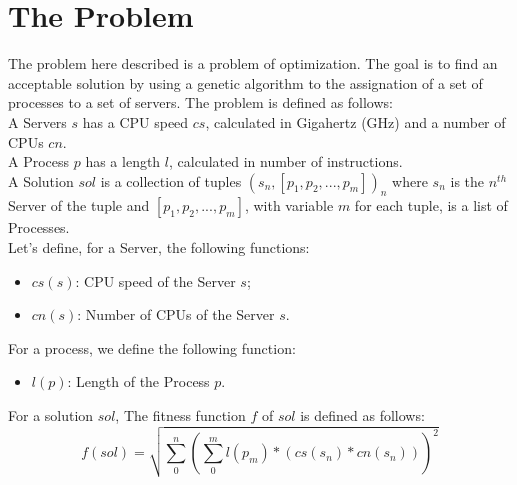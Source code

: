 \section{The Problem}\label{sect:problem}

The problem here described is a problem of optimization. 
The goal is to find an acceptable solution by using a genetic algorithm to the assignation of a set of processes to a set of servers.
The problem is defined as follows:\\
A Servers $s$ has a CPU speed $cs$, calculated in Gigahertz (GHz) and a number of CPUs $cn$.\\
A Process $p$ has a length $l$, calculated in number of instructions.\\
A Solution $sol$ is a collection of tuples $(s_n, [p_1, p_2, ..., p_m])_{n}$ where $s_n$ is the $n^{th}$ Server of the tuple 
and $[p_1, p_2, ..., p_m]$, with variable $m$ for each tuple, is a list of Processes.\\
Let's define, for a Server, the following functions:
\begin{itemize}
    \item $cs(s)$: CPU speed of the Server $s$;
    \item $cn(s)$: Number of CPUs of the Server $s$.\\
\end{itemize}
For a process, we define the following function:
\begin{itemize}
    \item $l(p)$: Length of the Process $p$.\\
\end{itemize}

For a solution $sol$, The fitness function $f$ of $sol$ is defined as follows:
\begin{equation}
    \label{fitness}
    f(sol) = \sqrt{\sum_{0}^{n}{(\sum_{0}^{m}l(p_m) * (cs(s_n) * cn(s_n)))^2}}
\end{equation}
